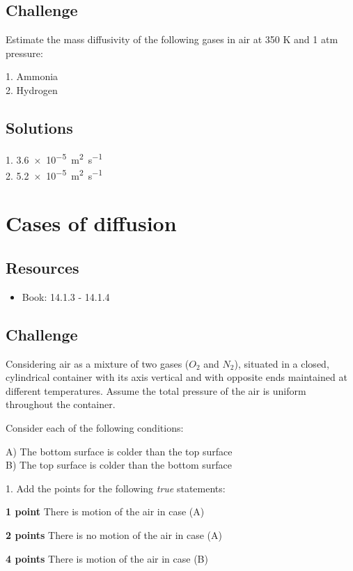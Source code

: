 \subsection*{Challenge}
Estimate the mass diffusivity of the following gases in air at 350 K and 1 atm pressure:

1. Ammonia\\
2. Hydrogen

\subsection*{Solutions}
1. \SI{3.6e-5}{\square\meter\per\second}\\
2. \SI{5.2e-5}{\square\meter\per\second}




\newpage
\section{Cases of diffusion}

\subsection*{Resources}
\begin{itemize}
    \item Book: 14.1.3 - 14.1.4
\end{itemize}

\subsection*{Challenge}
Considering air as a mixture of two gases ($O_2$ and $N_2$), situated in a closed, cylindrical container with its axis vertical and with opposite ends maintained at different temperatures. Assume the total pressure of the air is uniform throughout the container.

Consider each of the following conditions:

A) The bottom surface is colder than the top surface\\
B) The top surface is colder than the bottom surface

\vspace{1cm}
1. Add the points for the following \emph{true} statements:

\textbf{1 point} There is motion of the air in case (A)

\textbf{2 points} There is no motion of the air in case (A)

\textbf{4 points} There is motion of the air in case (B)

